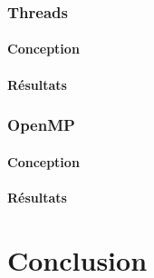 \documentclass[12pt]{article}
\begin{document}
		\subsubsection{Threads}
			\paragraph{Conception}
			\paragraph{Résultats}

		\subsubsection{OpenMP}
			\paragraph{Conception}
			\paragraph{Résultats}

\section{Conclusion}

\newpage


\end{document}
